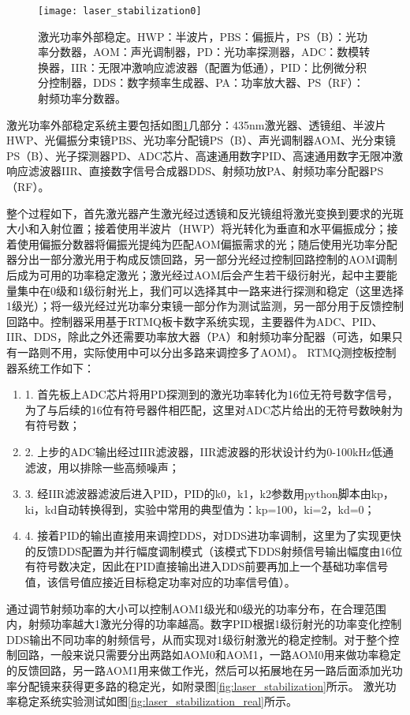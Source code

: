 \begin{figure}
    \centering
    \caption[激光功率外部稳定]{激光功率外部稳定。HWP：半波片，PBS：偏振片，PS（B）：光功率分数器，AOM：声光调制器，PD：光功率探测器，ADC：数模转换器，IIR：无限冲激响应滤波器（配置为低通），PID：比例微分积分控制器，DDS：数字频率生成器、PA：功率放大器、PS（RF）：射频功率分数器。\label{fig:laser_stabilization0}}
    \texttt{[image: laser\_stabilization0]}
\end{figure}

激光功率外部稳定系统主要包括如图\ref{fig:laser_stabilization0}几部分：435nm激光器、透镜组、半波片HWP、光偏振分束镜PBS、光功率分配镜PS（B）、声光调制器AOM、光分束镜PS（B）、光子探测器PD、ADC芯片、高速通用数字PID、高速通用数字无限冲激响应滤波器IIR、直接数字信号合成器DDS、射频功放PA、射频功率分配器PS（RF）。

整个过程如下，首先激光器产生激光经过透镜和反光镜组将激光变换到要求的光斑大小和入射位置；接着使用半波片（HWP）将光转化为垂直和水平偏振成分；接着使用偏振分数器将偏振光提纯为匹配AOM偏振需求的光；随后使用光功率分配器分出一部分激光用于构成反馈回路，另一部分光经过控制回路控制的AOM调制后成为可用的功率稳定激光；激光经过AOM后会产生若干级衍射光，起中主要能量集中在0级和1级衍射光上，我们可以选择其中一路来进行探测和稳定（这里选择1级光）；将一级光经过光功率分束镜一部分作为测试监测，另一部分用于反馈控制回路中。控制器采用基于RTMQ板卡数字系统实现，主要器件为ADC、PID、IIR、DDS，除此之外还需要功率放大器（PA）和射频功率分配器（可选，如果只有一路则不用，实际使用中可以分出多路来调控多了AOM）。
RTMQ测控板控制器系统工作如下：
\begin{enumerate}
    \item 1. 首先板上ADC芯片将用PD探测到的激光功率转化为16位无符号数字信号，为了与后续的16位有符号器件相匹配，这里对ADC芯片给出的无符号数映射为有符号数；
    \item 2. 上步的ADC输出经过IIR滤波器，IIR滤波器的形状设计约为0-100kHz低通滤波，用以排除一些高频噪声；
    \item 3. 经IIR滤波器滤波后进入PID，PID的k0，k1，k2参数用python脚本由kp，ki，kd自动转换得到，实验中常用的典型值为：kp=100，ki=2，kd=0；
    \item 4. 接着PID的输出直接用来调控DDS，对DDS进功率调制，这里为了实现更快的反馈DDS配置为并行幅度调制模式（该模式下DDS射频信号输出幅度由16位有符号数决定，因此在PID直接输出进入DDS前要再加上一个基础功率信号值，该信号值应接近目标稳定功率对应的功率信号值）。
\end{enumerate}

通过调节射频功率的大小可以控制AOM1级光和0级光的功率分布，在合理范围内，射频功率越大1激光分得的功率越高。数字PID根据1级衍射光的功率变化控制DDS输出不同功率的射频信号，从而实现对1级衍射激光的稳定控制。对于整个控制回路，一般来说只需要分出两路如AOM0和AOM1，一路AOM0用来做功率稳定的反馈回路，另一路AOM1用来做工作光，然后可以拓展地在另一路后面添加光功率分配镜来获得更多路的稳定光，如附录图\ref{fig:laser_stabilization}所示。
激光功率稳定系统实验测试如图\ref{fig:laser_stabilization_real}所示。

